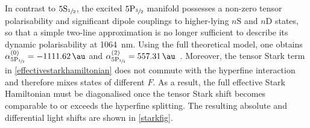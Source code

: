 \documentclass[../Thesis-IJspeert.tex]{subfiles}
\begin{document}
In contrast to $5\mathrm{S}_{\sfrac{1}{2}}$, the excited $5\mathrm{P}_{\sfrac{3}{2}}$ manifold possesses a non-zero tensor polarisability and significant dipole couplings to higher-lying $n\mathrm{S}$ and $n\mathrm{D}$ states, so that a simple two-line approximation is no longer sufficient to describe its dynamic polarisability at \SI{1064}{\nano\meter}. Using the full theoretical model, one obtains $\alpha^{(0)}_{{5\mathrm{P}_{\sfrac{3}{2}}}} = \SI{-1111.62}{\au}$ and $\alpha^{(2)}_{{5\mathrm{P}_{\sfrac{3}{2}}}} = \SI{557.31}{\au}$~\cite{Arora2012}. Moreover, the tensor Stark term in \autoref{effectivestarkhamiltonian} does not commute with the hyperfine interaction and therefore mixes states of different $F$. As a result, the full effective Stark Hamiltonian must be diagonalised once the tensor Stark shift becomes comparable to or exceeds the hyperfine splitting. The resulting absolute and differential light shifts are shown in \autoref{starkfig}.
\end{document}
